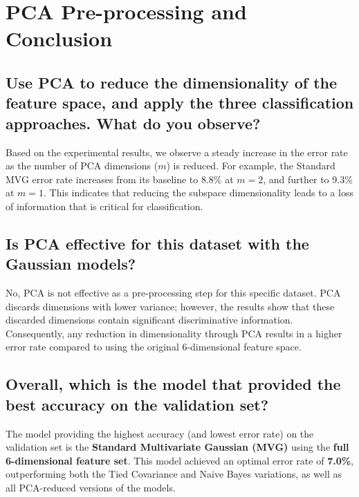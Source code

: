 \section{PCA Pre-processing and Conclusion}

\subsection*{Use PCA to reduce the dimensionality of the feature space, and apply the three classification approaches. What do you observe?}
Based on the experimental results, we observe a steady increase in the error rate as the number of PCA dimensions ($m$) is reduced. For example, the Standard MVG error rate increases from its baseline to 8.8\% at $m=2$, and further to 9.3\% at $m=1$. This indicates that reducing the subspace dimensionality leads to a loss of information that is critical for classification.

\subsection*{Is PCA effective for this dataset with the Gaussian models?}
No, PCA is not effective as a pre-processing step for this specific dataset. PCA discards dimensions with lower variance; however, the results show that these discarded dimensions contain significant discriminative information. Consequently, any reduction in dimensionality through PCA results in a higher error rate compared to using the original 6-dimensional feature space.

\subsection*{Overall, which is the model that provided the best accuracy on the validation set?}
The model providing the highest accuracy (and lowest error rate) on the validation set is the \textbf{Standard Multivariate Gaussian (MVG)} using the \textbf{full 6-dimensional feature set}. This model achieved an optimal error rate of \textbf{7.0\%}, outperforming both the Tied Covariance and Naive Bayes variations, as well as all PCA-reduced versions of the models.